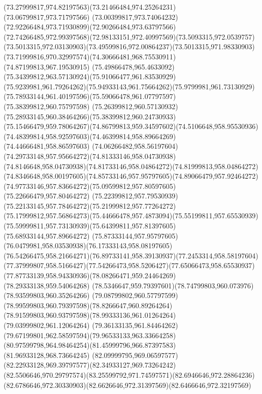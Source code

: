 {{	\curveto(73.27999817,974.82197563)(73.21466484,974.25264231)(73.06799817,973.71797566)
	\curveto(73.00399817,973.74064232)(72.92266484,973.71930899)(72.90266484,973.63797566)
	\curveto(72.74266485,972.99397568)(72.98133151,972.40997569)(73.5093315,972.0539757)
	\curveto(73.5013315,972.03130903)(73.49599816,972.00864237)(73.5013315,971.98330903)
	\curveto(73.71999816,970.32997574)(74.30666481,968.75530911)(74.87199813,967.19530915)
	\curveto(75.49866478,965.4633092)(75.34399812,963.57130924)(75.91066477,961.83530929)
	\curveto(75.9239981,961.79264262)(75.94933143,961.75664262)(75.9799981,961.73130929)
	\curveto(75.78933144,961.40197596)(75.59066478,961.07797597)(75.38399812,960.75797598)
	\curveto(75.26399812,960.57130932)(75.28933145,960.38464266)(75.38399812,960.24730933)
	\curveto(75.15466479,959.78064267)(74.86799813,959.34597602)(74.5106648,958.95530936)
	\curveto(74.48399814,958.92597603)(74.46399814,958.89664269)(74.44666481,958.86597603)
	\curveto(74.06266482,958.56197604)(74.29733148,957.95664272)(74.81333146,958.04730938)
	\curveto(74.8146648,958.04730938)(74.81733146,958.04864272)(74.81999813,958.04864272)
	\curveto(74.8346648,958.00197605)(74.85733146,957.95797605)(74.89066479,957.92464272)
	\curveto(74.97733146,957.83664272)(75.09599812,957.80597605)(75.22666479,957.80464272)
	\curveto(75.22399812,957.79530939)(75.22133145,957.78464272)(75.21999812,957.77264272)
	\curveto(75.17999812,957.56864273)(75.44666478,957.4873094)(75.55199811,957.65530939)
	\curveto(75.59999811,957.73130939)(75.64399811,957.81397605)(75.68933144,957.89664272)
	\curveto(75.87333144,957.95797605)(76.0479981,958.03530938)(76.17333143,958.08197605)
	\curveto(76.54266475,958.21664271)(76.89733141,958.39130937)(77.2453314,958.58197604)
	\curveto(77.37999807,958.5166427)(77.54266473,958.5206427)(77.65066473,958.65530937)
	\curveto(77.87733139,958.94330936)(78.08266471,959.24464269)(78.29333138,959.54064268)
	\curveto(78.5346647,959.79397601)(78.74799803,960.073976)(78.93599803,960.35264266)
	\curveto(79.08799802,960.57797599)(78.99599803,960.79397598)(78.8266647,960.89264264)
	\curveto(78.91599803,960.93797598)(78.99333136,961.01264264)(79.03999802,961.12064264)
	\curveto(79.36133135,961.84464262)(79.67199801,962.58597594)(79.96533133,963.33664258)
	\curveto(80.97599798,964.98464254)(81.45999796,966.87397583)(81.96933128,968.73664245)
	\curveto(82.09999795,969.06597577)(82.22933128,969.39797577)(82.34933127,969.73264242)
	\curveto(82.5506646,970.29797574)(83.25599792,971.74597571)(82.6946646,972.28864236)
	\curveto(82.6786646,972.30330903)(82.6626646,972.31397569)(82.6466646,972.32197569)
}}
